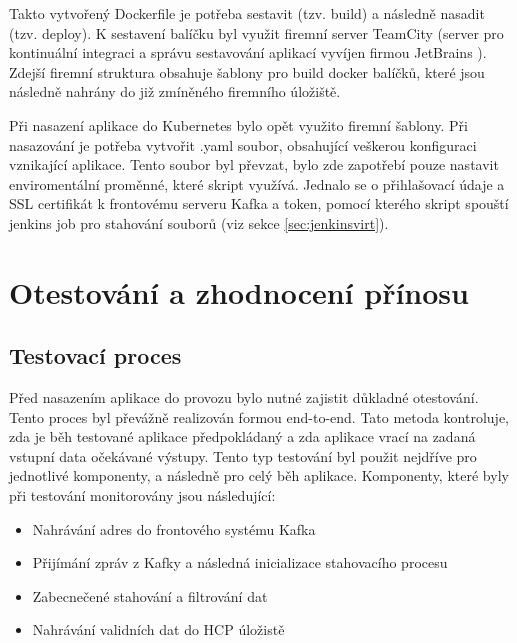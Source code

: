 \documentclass[thesis=M,czech,hidelinks]{FITthesis}[2013/05/06]
\begin{document}
Takto vytvořený Dockerfile je potřeba sestavit (tzv. build) a následně nasadit (tzv. deploy). K sestavení balíčku byl využit firemní server TeamCity (server pro kontinuální integraci a správu sestavování aplikací vyvíjen firmou JetBrains \cite{teamcity}). Zdejší firemní struktura obsahuje šablony pro build docker balíčků, které jsou následně nahrány do již zmíněného firemního úložiště.

Při nasazení aplikace do Kubernetes bylo opět využito firemní šablony. Při nasazování je potřeba vytvořit .yaml soubor, obsahující veškerou konfiguraci vznikající aplikace. Tento soubor byl převzat, bylo zde zapotřebí pouze nastavit enviromentální proměnné, které skript využívá. Jednalo se o přihlašovací údaje a SSL certifikát k frontovému serveru Kafka a token, pomocí kterého skript spouští jenkins job pro stahování souborů (viz sekce \ref{sec:jenkinsvirt}).











\chapter{Otestování a zhodnocení přínosu}


\section{Testovací proces}
Před nasazením aplikace do provozu bylo nutné zajistit důkladné otestování. Tento proces byl převážně realizován formou end-to-end. Tato metoda kontroluje, zda je běh testované aplikace předpokládaný a zda aplikace vrací na zadaná vstupní data očekávané výstupy. Tento typ testování byl použit nejdříve pro jednotlivé komponenty, a následně pro celý běh aplikace. Komponenty, které byly při testování monitorovány jsou následující:
\begin{itemize}
	\item Nahrávání adres do frontového systému Kafka
	\item Přijímání zpráv z Kafky a následná inicializace stahovacího procesu
	\item Zabecnečené stahování a filtrování dat
	\item Nahrávání validních dat do HCP úložistě 
\end{itemize}
\end{document}
